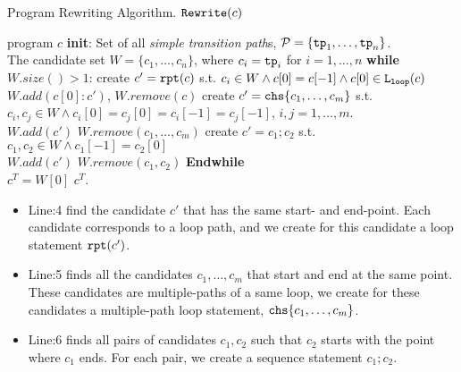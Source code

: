\begin{algorithm}
 \caption{Program Rewriting Algorithm. $\mathtt{Rewrite}(c)$}
 \label{alg:alg-refine_rewrite}
 \begin{algorithmic}[1]
 \REQUIRE program $c$
 \STATE \textbf{init}: 
 Set of all \emph{simple transition path}s, 
 $\mathcal{P} = \{ \mathtt{tp}_1, \ldots, \mathtt{tp}_n \}$.
 \\
 The candidate set $W = \{c_1, \ldots, c_n\}$, where $c_i = \mathtt{tp}_i$ for $i = 1, \ldots, n$
 \STATE \textbf{while} $W.size()> 1$:
 \STATE
 \quad create $c' = \mathtt{rpt}(c)$ s.t. $c_i \in W \land c[0] = c[-1] \land c[0] \in \mathtt{L}_{\mathtt{loop}}(c)$
 \\ \quad $W.add(c[0]: c')$, \qquad $W.remove(c)$
 \STATE \quad create $c' = \rpchoose{c_1, \ldots, c_m}$ 
 s.t. $c_i, c_j \in W \land c_i[0] = c_j[0] = c_i[-1] = c_j[-1]$, $i, j = 1, \ldots, m$.
 \\ \quad $W.add(c')$ \qquad $W.remove(c_1, \ldots, c_m)$
 \STATE \quad create $c' = c_1; c_2$ s.t. $c_1, c_2 \in W \land c_1[-1] = c_2[0]$
 \\
 \quad $W.add(c')$ \qquad $W.remove(c_1, c_2)$
 \STATE \textbf{Endwhile}
 \\ $c^T = W[0]$
 \RETURN $c^T$.
\end{algorithmic}
\end{algorithm}
%
\begin{itemize}
\item
Line:4 find the candidate $c'$ that has the same start- and end-point.
Each candidate corresponds to a loop path, and we create for this candidate a loop statement
$\mathtt{rpt}(c')$.

\item
 Line:5 
 finds all the candidates $c_1, \ldots, c_m$ that start and end at the same point.
 These candidates are multiple-paths of a same loop, 
 we create for these candidates a multiple-path loop statement,  $\rpchoose{c_1, \ldots, c_m}$.
\item
Line:6 finds all pairs of candidates $c_1, c_2$ such that  $c_2$ starts with the point where $c_1$ ends.
For each pair, we create a sequence statement
 $c_1; c_2$.
\end{itemize}